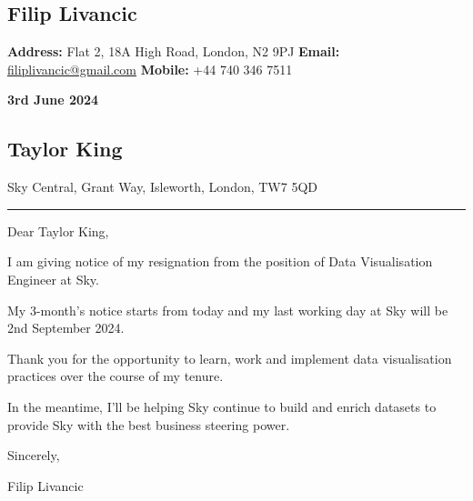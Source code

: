 \documentclass[a4paper,11pt]{article}
\date{}
\begin{document}
\subsection*{\hfill{Filip Livancic}}

\begin{flushright}

    \textbf{Address: }Flat 2,   \linebreak
		18A High Road,  \linebreak
	    London, N2 9PJ \linebreak
    \textbf{Email: }\href{mailto:filiplivancic@gmail.com}{filiplivancic@gmail.com} \linebreak
    \textbf{Mobile: }+44 740 346 7511 \linebreak

\end{flushright}

\begin{flushleft}
	\textbf{3rd June 2024}
\newline
    \subsection*{Taylor King}
Sky Central,\newline
Grant Way,\newline
Isleworth,\newline
London, \newline
TW7 5QD\newline
\end{flushleft}

\hrule


\begin{flushleft}

Dear Taylor King,\newline

I am giving notice of my resignation from the position of Data Visualisation Engineer at Sky. \newline

My 3-month's notice starts from today and my last working day at Sky will be 2nd September 2024. \newline

Thank you for the opportunity to learn, work and implement data visualisation practices over the course of my tenure. \newline

In the meantime, I'll be helping Sky continue to build and enrich datasets to provide Sky with the best business steering power. \newline

Sincerely,\newline

Filip Livancic

\end{flushleft}
\end{document}
